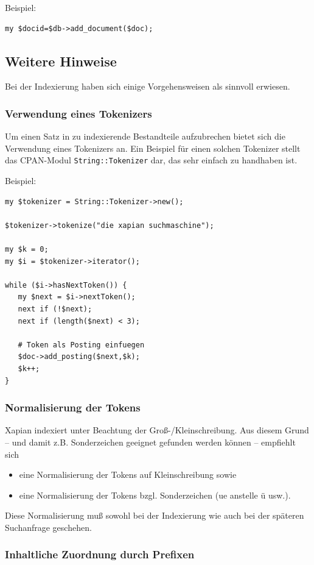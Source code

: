\documentclass[11pt, twoside, a4paper, BCOR8mm, DIV12, bibtotoc,idxtotoc]{scrbook}
\begin{document}
Beispiel:
\begin{verbatim}
my $docid=$db->add_document($doc);
\end{verbatim}


\subsection{Weitere Hinweise}
Bei der Indexierung haben sich einige Vorgehensweisen als sinnvoll
erwiesen.

\subsubsection{Verwendung eines Tokenizers}
Um einen Satz in zu indexierende Bestandteile aufzubrechen bietet sich
die Verwendung eines Tokenizers an. Ein Beispiel für einen solchen
Tokenizer stellt das CPAN-Modul \texttt{String::Tokenizer} dar, das
sehr einfach zu handhaben ist.

Beispiel:
\begin{verbatim}
my $tokenizer = String::Tokenizer->new();

$tokenizer->tokenize("die xapian suchmaschine");

my $k = 0;        
my $i = $tokenizer->iterator();

while ($i->hasNextToken()) {
   my $next = $i->nextToken();
   next if (!$next);
   next if (length($next) < 3);

   # Token als Posting einfuegen
   $doc->add_posting($next,$k);
   $k++;
}
\end{verbatim}

\subsubsection{Normalisierung der Tokens}
Xapian indexiert unter Beachtung der Groß-/Kleinschreibung. Aus diesem
Grund -- und damit z.B. Sonderzeichen geeignet gefunden werden können
-- empfiehlt sich
\begin{itemize}
\item eine Normalisierung der Tokens auf Kleinschreibung sowie
\item eine Normalisierung der Tokens bzgl. Sonderzeichen (ue anstelle
  ü usw.).
\end{itemize}

Diese Normalisierung muß sowohl bei der Indexierung wie auch bei der
späteren Suchanfrage geschehen.

\subsubsection{Inhaltliche Zuordnung durch Prefixen}
\end{document}
